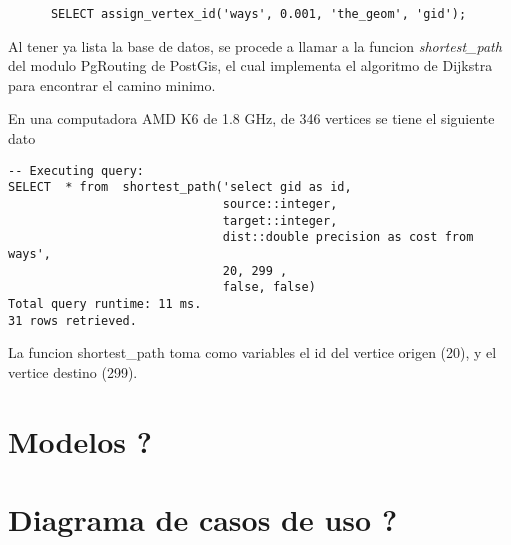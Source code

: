     \begin{center}
      \begin{verbatim}
      SELECT assign_vertex_id('ways', 0.001, 'the_geom', 'gid');
      \end{verbatim}
    \end{center}

    Al tener ya lista la base de datos, se procede a llamar a la funcion \emph{shortest\_path} del modulo PgRouting  de PostGis, el cual implementa el algoritmo de Dijkstra para encontrar el camino minimo.

    En una computadora AMD K6 de 1.8 GHz, de 346 vertices se tiene el siguiente dato

    \begin{center}
      \begin{verbatim}
-- Executing query:
SELECT  * from  shortest_path('select gid as id,
                              source::integer,
                              target::integer,
                              dist::double precision as cost from ways',
                              20, 299 ,
                              false, false)
Total query runtime: 11 ms.
31 rows retrieved.
      \end{verbatim}
    \end{center}

    La funcion shortest\_path toma como variables el id del vertice origen (20), y el vertice destino (299).



  \section{Modelos ?} %
  \label{sec:modelos_}

  \section{Diagrama de casos de uso ?} %
  \label{sec:diagrama_de_casos_de_uso_}










